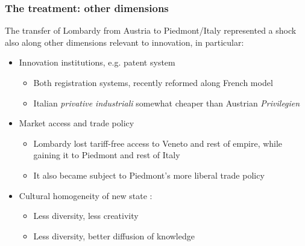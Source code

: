 \documentclass[10pt]{beamer}
\begin{document}
\begin{frame}[label = other_dimensions]
    \frametitle{The treatment: other dimensions}
    
    The transfer of Lombardy from Austria to Piedmont/Italy represented a shock also along other dimensions relevant to innovation, in particular:

    \begin{itemize}
        \item Innovation institutions, e.g. patent system

        \begin{itemize}
            \item Both registration systems, recently reformed along French model
            \item Italian \textit{privative industriali} somewhat cheaper than Austrian \textit{Privilegien}  
            \hyperlink{patent_fees}{}  
        \end{itemize}

        \pause
        
        \item Market access and trade policy

        \begin{itemize}
            \item Lombardy lost tariff-free access to Veneto and rest of empire, while gaining it to Piedmont and rest of Italy
            \item It also became subject to Piedmont's more liberal trade policy 
        \end{itemize}

        \pause
        
        \item Cultural homogeneity of new state \citep{ertug2022, mokyr2024}:

        \begin{itemize}
            \item Less diversity, less creativity 
            \item Less diversity, better diffusion of knowledge
        \end{itemize}

    \end{itemize}
    
\end{frame}
\end{document}
